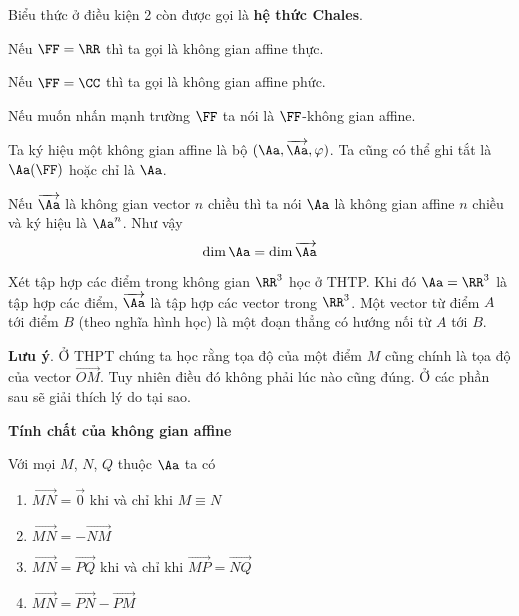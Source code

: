 Biểu thức ở điều kiện 2 còn được gọi là \textbf{hệ thức Chales}.

Nếu $\FF = \RR$ thì ta gọi là không gian affine thực.

Nếu $\FF = \CC$ thì ta gọi là không gian affine phức.

Nếu muốn nhấn mạnh trường $\FF$ ta nói là $\FF$-không gian affine.

Ta ký hiệu một không gian affine là bộ $(\Aa, \overrightarrow{\Aa}, \varphi)$. Ta cũng có thể ghi tắt là $\Aa(\FF)$ hoặc chỉ là $\Aa$.

Nếu $\overrightarrow{\Aa}$ là không gian vector $n$ chiều thì ta nói $\Aa$ là không gian affine $n$ chiều và ký hiệu là $\Aa^n$. Như vậy \[\dim \Aa = \dim \overrightarrow{\Aa}\]

\begin{example}
	Xét tập hợp các điểm trong không gian $\RR^3$ học ở THTP. Khi đó $\Aa = \RR^3$ là tập hợp các điểm, $\overrightarrow{\Aa}$ là tập hợp các vector trong $\RR^3$. Một vector từ điểm $A$ tới điểm $B$ (theo nghĩa hình học) là một đoạn thẳng có hướng nối từ $A$ tới $B$.
\end{example}

\textbf{Lưu ý}. Ở THPT chúng ta học rằng tọa độ của một điểm $M$ cũng chính là tọa độ của vector $\overrightarrow{OM}$. Tuy nhiên điều đó không phải lúc nào cũng đúng. Ở các phần sau sẽ giải thích lý do tại sao.

\textbf{Tính chất của không gian affine}

Với mọi $M$, $N$, $Q$ thuộc $\Aa$ ta có

\begin{enumerate}
	\item $\overrightarrow{MN} = \overrightarrow{0}$ khi và chỉ khi $M \equiv N$
	\item $\overrightarrow{MN} = -\overrightarrow{NM}$
	\item $\overrightarrow{MN} = \overrightarrow{PQ}$ khi và chỉ khi $\overrightarrow{MP} = \overrightarrow{NQ}$
	\item $\overrightarrow{MN} = \overrightarrow{PN} - \overrightarrow{PM}$
\end{enumerate}

